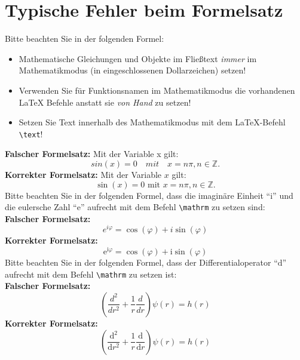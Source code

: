 \documentclass[11pt,a4paper]{scrartcl}
\begin{document}
%
\section{Typische Fehler beim Formelsatz}
Bitte beachten Sie in der folgenden Formel:
%
\begin{itemize}
  \item Mathematische Gleichungen und Objekte im Fließtext
    \emph{immer} im Mathematikmodus (in eingeschlossenen
    Dollarzeichen) setzen!
  \item Verwenden Sie für Funktionsnamen im Mathematikmodus
    die vorhandenen \LaTeX{} Befehle anstatt sie \emph{von Hand}
    zu setzen!
  \item Setzen Sie Text innerhalb des Mathematikmodus mit dem
    \LaTeX{}-Befehl \texttt{\textbackslash text}!    
\end{itemize}
\textbf{Falscher Formelsatz:} Mit der Variable x gilt: 
\[
  sin(x)=0   \quad mit \quad  x=n\pi, n\in\mathbb{Z}.
\]
\textbf{Korrekter Formelsatz:} Mit der Variable $x$ gilt: 
\[
  \sin(x)=0   \text{  mit  }  x= n\pi, n\in\mathbb{Z}.
\]
Bitte beachten Sie in der folgenden Formel, dass die imaginäre Einheit
\enquote{$\mathrm{i}$} und die eulersche Zahl \enquote{$\mathrm{e}$} aufrecht mit dem
Befehl \texttt{\textbackslash mathrm} zu setzen sind:\\
\textbf{Falscher Formelsatz:} 
\[
  e^{i\varphi}=\cos(\varphi)+i\sin(\varphi)
\]
\textbf{Korrekter Formelsatz:} 
\[
  \mathrm{e}^{\mathrm{i}\varphi}=\cos(\varphi)+\mathrm{i}\sin(\varphi)
\]
Bitte beachten Sie in der folgenden Formel, dass der Differentialoperator
\enquote{$\mathrm{d}$} aufrecht mit dem
Befehl \texttt{\textbackslash mathrm} zu setzen ist:\\
\textbf{Falscher Formelsatz:} 
\[
  \left(\frac{d^{2}}{dr^{2}} + \frac{1}{r}\frac{d}{dr}\right)\psi(r)=h(r)
\]
\textbf{Korrekter Formelsatz:} 
\[
  \left(\frac{\mathrm{d}^{2}}{\mathrm{d}r^{2}} +
  \frac{1}{r}\frac{\mathrm{d}}{\mathrm{d}r}\right)\psi(r)=
  h(r)
\]
%
\end{document}
